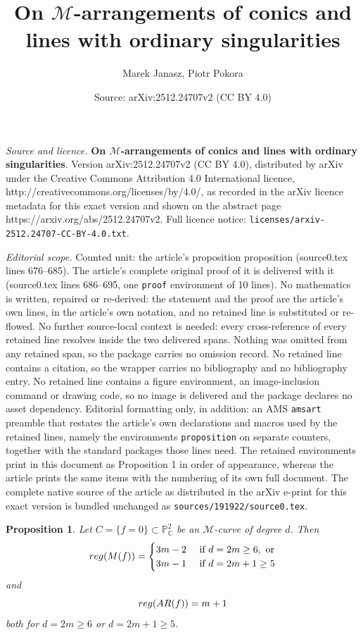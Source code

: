 \documentclass[10pt,a4paper]{amsart}
\title{\textbf{On $\mathscr{M}$-arrangements of conics and lines with ordinary singularities}}
\author{Marek Janasz, Piotr Pokora}
\date{Source: arXiv:2512.24707v2 (CC BY 4.0)}
\newtheorem{proposition}{Proposition}
\begin{document}
\maketitle

\noindent\emph{Source and licence.} \textbf{On $\mathscr{M}$-arrangements of conics and lines with ordinary singularities}. Version arXiv:2512.24707v2 (CC BY 4.0), distributed by arXiv under the Creative Commons Attribution 4.0 International licence, http://creativecommons.org/licenses/by/4.0/, as recorded in the arXiv licence metadata for this exact version and shown on the abstract page https://arxiv.org/abs/2512.24707v2. Full licence notice: \texttt{licenses/arxiv-2512.24707-CC-BY-4.0.txt}.\par\smallskip

\noindent\textit{Editorial scope.} Counted unit: the article's proposition proposition (source0.tex lines 676--685). The article's complete original proof of it is delivered with it (source0.tex lines 686--695, one \texttt{proof} environment of 10 lines). No mathematics is written, repaired or re-derived: the statement and the proof are the article's own lines, in the article's own notation, and no retained line is substituted or re-flowed.  No further source-local context is needed: every cross-reference of every retained line resolves inside the two delivered spans.  Nothing was omitted from any retained span, so the package carries no omission record.  No retained line contains a citation, so the wrapper carries no bibliography and no bibliography entry.  No retained line contains a figure environment, an image-inclusion command or drawing code, so no image is delivered and the package declares no asset dependency.  Editorial formatting only, in addition: an AMS \texttt{amsart} preamble that restates the article's own declarations and macros used by the retained lines, namely the environments \texttt{proposition} on separate counters, together with the standard packages those lines need.  The retained environments print in this document as Proposition 1 in order of appearance, whereas the article prints the same items with the numbering of its own full document.  The complete native source of the article as distributed in the arXiv e-print for this exact version is bundled unchanged as \texttt{sources/191922/source0.tex}.
\begin{proposition}
Let $C = \{f=0\}\subset \mathbb{P}^{2}_{\mathbb{C}}$ be an $\mathscr{M}$-curve of degree $d$. Then
$${\rm reg}(M(f)) = \begin{cases}
3m-2 & \text{ if } d=2m\geq 6, \text{ or}\\
3m-1 & \text{ if } d=2m+1 \geq 5
\end{cases}$$
and
$${\rm reg}({\rm AR}(f)) = m+1$$
both for $d=2m\geq 6$ or $d=2m+1\geq 5$.
\end{proposition}
\end{document}
